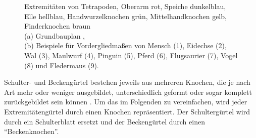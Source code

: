  \begin{figure}
   \label{grundbauplan}
  \qquad
   \label{bsp_extremitaeten}
  
  \caption{Extremitäten von Tetrapoden, Oberarm rot, Speiche dunkelblau, Elle hellblau, Handwurzelknochen grün, Mittelhandknochen gelb, Finderknochen braun\\
  (a) Grundbauplan \cite[S.\ 487, vereinfacht und eingefärbt]{AllgemeineZoologie},\\
  (b) Beispiele für Vordergliedmaßen von Mensch (1), Eidechse (2), Wal (3), Maulwurf (4), Pinguin (5), Pferd (6), Flugsaurier (7), Vogel (8) und Fledermaus (9). \mbox{\cite[S.\ 474]{dtvBiologie}}}
  \label{extremities}
 \end{figure}

Schulter- und Beckengürtel bestehen  jeweils aus mehreren Knochen, die je nach Art mehr oder weniger ausgebildet, unterschiedlich geformt oder sogar komplett zurückgebildet sein können \cite[Absatz 9.7]{Vergleichende_Anatomie}. Um das im Folgenden zu vereinfachen, wird jeder Extremitätengürtel durch einen Knochen repräsentiert. Der Schultergürtel wird durch ein Schulterblatt ersetzt und der Beckengürtel durch einen "`Beckenknochen"'.

